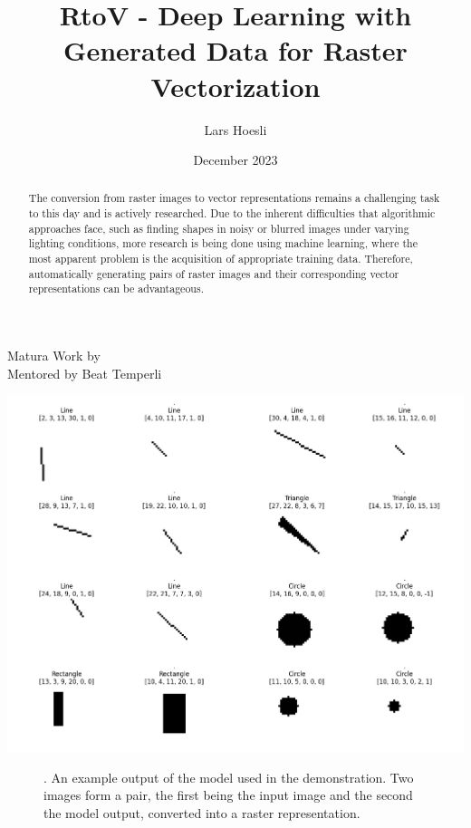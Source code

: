 \documentclass[12pt, a4paper, titlepage]{report}
\title{RtoV - Deep Learning with Generated Data for Raster Vectorization}
\author{Lars Hoesli}
\date{December 2023}
\begin{document}

\begin{titlepage}
    \centering

    \Huge{\textbf{\inserttitle}}
    \par\vspace{0.5cm}
    \Large{Matura Work by \insertauthor}\\
    \vspace{0.1cm}
    \large{Mentored by Beat Temperli}\\
    \vspace{0.2cm}
    \large{\insertdate}
    \vspace{1cm}

    {
       \includegraphics[width=1.2\textwidth]{../rc/images/all_shapes_approx_visual4_1.png}
       \label{fig:results_demonstration1}
    }
    \begin{figure}[h]
       \centering
       \caption{\cite{results_demonstration1}. An example output of the model used in the demonstration. Two images form a pair, the first being the input image and the second the model output, converted into a raster representation.}
    \end{figure}

    \vfill
    \begin{abstract}
       The conversion from raster images to vector representations remains a challenging task to this day and is actively researched. Due to the inherent difficulties that algorithmic approaches face, such as finding shapes in noisy or blurred images under varying lighting conditions, more research is being done using machine learning, where the most apparent problem is the acquisition of appropriate training data. Therefore, automatically generating pairs of raster images and their corresponding vector representations can be advantageous.


\end{abstract}
\end{titlepage}
\end{document}
